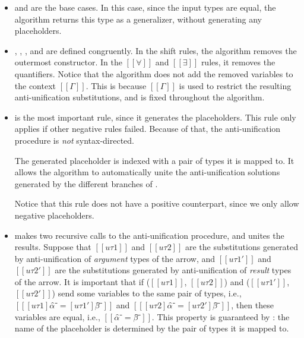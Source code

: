 \begin{itemize}
  \item {} and 
    are the base cases. 
    In this case, since the input types are equal, 
    the algorithm returns this type as a generalizer,
    without generating any placeholders.

  \item {}, ,
    , and 
    are defined congruently. In the shift rules, the algorithm
    removes the outermost constructor. In the
    $[[∀]]$ and $[[∃]]$ rules, it removes the quantifiers.
    Notice that the algorithm does not add the removed variables to
    the context $[[Γ]]$. This is because $[[Γ]]$
    is used to restrict the resulting anti-unification substitutions, 
    and is fixed throughout the algorithm.

  \item {} is the most important rule, 
    since it generates the placeholders. 
    This rule only applies if other negative rules failed.
    Because of that, the anti-unification procedure is 
    \emph{not} syntax-directed. 

    The generated placeholder is indexed with a pair of 
    types it is mapped to. It allows the algorithm to 
    automatically unite the anti-unification solutions 
    generated by the different branches of 
    .

    Notice that this rule does not have a positive counterpart,
    since we only allow negative placeholders.

  \item {}
    makes two recursive calls to the anti-unification procedure,
    and unites the results. Suppose that
    $[[uτ1]]$  and $[[uτ2]]$ are the substitutions generated by
    anti-unification of \emph{argument} types of the arrow,
    and $[[uτ1']]$ and $[[uτ2']]$ are the substitutions generated by 
    anti-unification of \emph{result} types of the arrow.
    It is important that if ($[[uτ1]]$, $[[uτ2]]$)
    and ($[[uτ1']]$, $[[uτ2']]$) send some variables to the same pair of types,
    i.e., $[[ [uτ1]α̂⁻ = [uτ1']β̂⁻]]$ and $[[ [uτ2]α̂⁻ = [uτ2']β̂⁻]]$,
    then these variables are equal, i.e., $[[α̂⁻ = β̂⁻]]$.
    This property is guaranteed by :
    the name of the placeholder is determined by the pair of 
    types it is mapped to.
\end{itemize}

